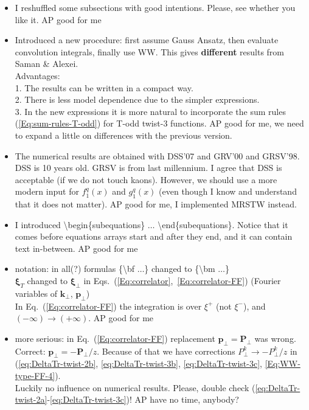 \documentclass[a4paper,11pt]{article}
\newcommand{\blue}[1]{{\color{blue} #1}}
\newcommand{\red}[1]{{\color{red} #1}}
\def\bfpperp{{\bm P}_\perp}
\def\pperp{P_\perp}
\begin{document}
\begin{itemize}

\item	I reshuffled some subsections with good intentions.
	Please, see whether you like it. {\color{red} AP good for me}

\item	Introduced a new procedure: first assume Gauss Ansatz,
	then evaluate convolution integrals, finally use WW.
	This gives \blue{\bf different} results from Saman \& Alexei.\\
	Advantages: \\
	1. The results can be written in a compact way.\\
	2. There is less model dependence due to the simpler expressions.\\
	3. In the new expressions it is more natural to incorporate the 
	sum rules (\ref{Eq:sum-rules-T-odd}) for T-odd twist-3 functions.
	{\color{red} AP good for me, we need to expand a little on differences with the previous version.}

\item   The numerical results are obtained with 
	DSS'07 and GRV'00 and GRSV'98.
	DSS is 10 years old. GRSV is from last millennium.
	I agree that DSS is acceptable (if we do not touch kaons). 
	However, we should use a more modern input for $f_1^q(x)$ and 
	$g_1^q(x)$ (even though I know and understand that it does not matter).
	 {\color{red} AP good for me, I implemented MRSTW instead.}

\item 	I introduced 
	{\textbackslash}begin\{subequations\} $\dots$
	{\textbackslash}end\{subequations\}. Notice that it comes
	before equations arrays start and after they end, and it can
	contain text in-between.  {\color{red} AP good for me}

\item	notation: in all(?) formulas 
	{\{{\textbackslash}bf $\dots$\}} changed to
	{\{{\textbackslash}bm $\dots$\}} \\
	${\bm \xi}_T$ changed to ${\bm \xi}_\perp$ in 
	Eqs.~(\ref{Eq:correlator},~\ref{Eq:correlator-FF})
	(Fourier variables of ${\bm k}_\perp$, ${\bm p}_\perp$)\\
	In Eq.~(\ref{Eq:correlator-FF}) the integration is over
	$\xi^+$ (not $\xi^-$), and $(-\infty)\to(+\infty)$.  {\color{red} AP good for me}

\item	more serious: in Eq.~(\ref{Eq:correlator-FF}) replacement 
	${\bm p}_\perp = \bfpperp$ was wrong. Correct:
	${\bm p}_\perp = -\bfpperp/z$.
	Because of that we have corrections
	$\pperp^k\to - \pperp^k/z$ in 
	(\ref{eq:DeltaTr-twist-2b},
	 \ref{eq:DeltaTr-twist-3b},
	 \ref{eq:DeltaTr-twist-3c},
	 \ref{Eq:WW-type-FF-4}). \\
	Luckily no influence on numerical results. \red{Please, double check 
	(\ref{eq:DeltaTr-twist-2a}-\ref{eq:DeltaTr-twist-3c})!}  {\color{red} AP have no time, anybody?}


\end{itemize}
\end{document}
